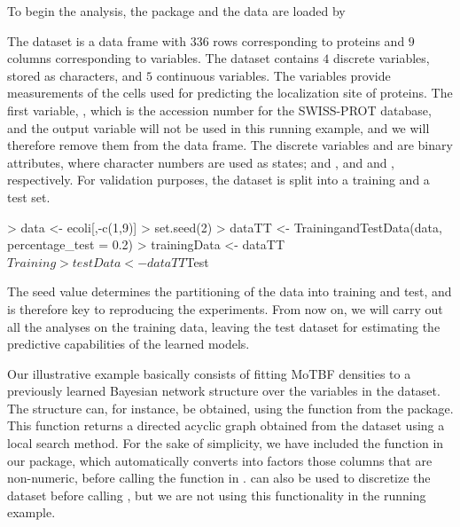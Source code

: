 To begin the analysis, the package and the data are loaded by


The  dataset is a data frame with $336$ rows corresponding to proteins and $9$ columns corresponding to variables.
The dataset contains $4$ discrete variables, stored as characters, and $5$ continuous variables. The variables
provide measurements of the cells used for predicting the localization site of proteins. 
The first variable, , which
is the accession number for the SWISS-PROT database, and the output variable  will not be used
in this running example, and we will  therefore remove them from the data frame.
The discrete variables  and  are binary attributes, where character numbers are used as states;  and , and  and , respectively. For validation purposes, the dataset is split into 
a training and a test set. 


\begin{example}
>   data <- ecoli[,-c(1,9)]
>   set.seed(2)
>   dataTT <- TrainingandTestData(data, percentage_test = 0.2)
>   trainingData <- dataTT$Training
>   testData <- dataTT$Test
\end{example}

The seed value determines the partitioning of the data into training and test, and is therefore key to
reproducing the experiments.
From now on, we will carry out all the analyses on the training data, leaving the test dataset for estimating the 
predictive capabilities of the learned models.

Our illustrative example basically consists of fitting MoTBF densities to a previously learned Bayesian
network structure over the variables in the dataset. The structure can, for instance, be obtained, using the function 
from the 
 package. This function returns a directed acyclic graph obtained from the dataset using 
a local search method. For the sake of simplicity, we have included the function  in our package,
which automatically converts into factors those columns that are non-numeric, before calling the function 
in .   can also be used to discretize the dataset before calling , but
we are not using this functionality in the running example.

